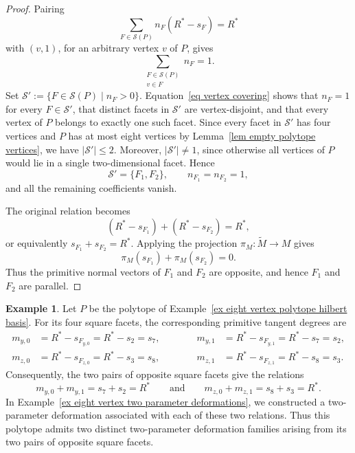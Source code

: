 \documentclass[11pt]{amsart}
\numberwithin{equation}{section}
\theoremstyle{plain}
\theoremstyle{definition}
\newtheorem{example}[theorem]{Example}
\newcommand{\0}{$0$-mutable}
\renewcommand{\1}{$1$-rigid}
\renewcommand{\0}{$0$-mutable}
\begin{document}
\begin{proof}
Pairing
\[
\sum_{F\in\mathcal S(P)}
n_F(R^*-s_F)=R^*
\]
with \((v,1)\), for an arbitrary vertex \(v\) of \(P\), gives
\begin{equation}\label{eq vertex covering}
\sum_{\substack{F\in\mathcal S(P)\\ v\in F}}n_F=1.
\end{equation}
Set
$
\mathcal S'
:=
\{F\in\mathcal S(P)\mid n_F>0\}.
$
Equation~\eqref{eq vertex covering} shows that \(n_F=1\) for every
\(F\in\mathcal S'\), that distinct facets in \(\mathcal S'\) are
vertex-disjoint, and that every vertex of \(P\) belongs to exactly one
such facet. Since every facet in \(\mathcal S'\) has four vertices and
\(P\) has at most eight vertices by
Lemma~\ref{lem empty polytope vertices}, we have
$
|\mathcal S'|\leq2.
$
Moreover, \(|\mathcal S'|\neq1\), since otherwise all vertices of \(P\)
would lie in a single two-dimensional facet. Hence
\[
\mathcal S'=\{F_1,F_2\},
\qquad
n_{F_1}=n_{F_2}=1,
\]
and all the remaining coefficients vanish.

The original relation becomes
\[
(R^*-s_{F_1})+(R^*-s_{F_2})=R^*,
\]
or equivalently
$
s_{F_1}+s_{F_2}=R^*.
$
Applying the projection
$
\pi_M\colon\widetilde M\longrightarrow M
$
gives
\[
\pi_M(s_{F_1})+\pi_M(s_{F_2})=0.
\]
Thus the primitive normal vectors of \(F_1\) and \(F_2\) are opposite,
and hence \(F_1\) and \(F_2\) are parallel.
\end{proof}






\begin{example}\label{ex eight vertex primitive sums}
Let \(P\) be the polytope of
Example~\ref{ex eight vertex polytope hilbert basis}. For its four
square facets, the corresponding primitive tangent degrees are
\[
\begin{aligned}
m_{y,0}&=R^*-s_{F_{y,0}}=R^*-s_2=s_7,
&\hspace{3em}
m_{y,1}&=R^*-s_{F_{y,1}}=R^*-s_7=s_2,\\
m_{z,0}&=R^*-s_{F_{z,0}}=R^*-s_3=s_8,
&\hspace{3em}
m_{z,1}&=R^*-s_{F_{z,1}}=R^*-s_8=s_3.
\end{aligned}
\]
Consequently, the two pairs of opposite square facets give the
relations
\[
m_{y,0}+m_{y,1}
=
s_7+s_2
=
R^*
\qquad
\text{and}
\qquad
m_{z,0}+m_{z,1}
=
s_8+s_3
=
R^*.
\]
In Example~\ref{ex eight vertex two parameter deformations}, we
constructed a two-parameter deformation associated with each of these
two relations. Thus this polytope admits two distinct two-parameter
deformation families arising from its two pairs of opposite square
facets.
\end{example}
\end{document}
